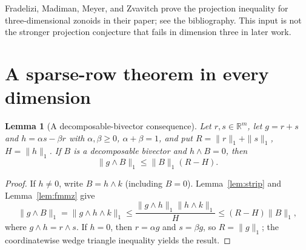\documentclass[11pt]{article}
\newtheorem{lemma}[theorem]{Lemma}
\newcommand{\R}{\mathbb R}
\begin{document}
Fradelizi, Madiman, Meyer, and Zvavitch prove the projection inequality for three-dimensional zonoids in their paper; see the bibliography. This input is not the stronger projection conjecture that fails in dimension three in later work.

\section{A sparse-row theorem in every dimension}
\begin{lemma}[A decomposable-bivector consequence]\label{lem:decomp}
Let $r,s\in\R^m$, let $g=r+s$ and $h=\alpha s-\beta r$ with $\alpha,\beta\geq0$, $\alpha+\beta=1$, and put $R=\|r\|_1+\|s\|_1$, $H=\|h\|_1$. If $B$ is a decomposable bivector and $h\wedge B=0$, then
\[
                         \|g\wedge B\|_1\leq\|B\|_1(R-H).
\]
\end{lemma}
\begin{proof}
If $h\ne0$, write $B=h\wedge k$ (including $B=0$). Lemma~\ref{lem:strip} and Lemma~\ref{lem:fmmz} give
\[
 \|g\wedge B\|_1=\|g\wedge h\wedge k\|_1
 \leq\frac{\|g\wedge h\|_1\|h\wedge k\|_1}{H}
 \leq(R-H)\|B\|_1,
\]
where $g\wedge h=r\wedge s$. If $h=0$, then $r=\alpha g$ and $s=\beta g$, so $R=\|g\|_1$; the coordinatewise wedge triangle inequality yields the result.
\end{proof}
\end{document}
